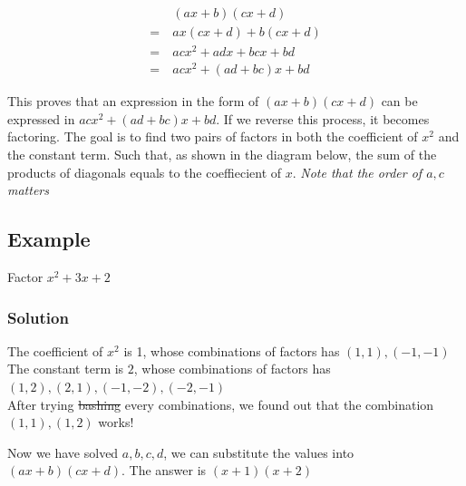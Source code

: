 \documentclass{article}
\begin{document}
\begin{align*}
    &(ax+b)(cx+d)\\
    =\ &ax(cx+d)+b(cx+d)\\
    =\ &acx^2+adx+bcx+bd\\
    =\ &acx^2+(ad+bc)x+bd
\end{align*}
\medskip

This proves that an expression in the form of $(ax+b)(cx+d)$ can be expressed in $acx^2+(ad+bc)x+bd$. If we reverse this process, it becomes factoring. The goal is to find two pairs of factors in both the coefficient of $x^2$ and the constant term. Such that, as shown in the diagram below, the sum of the products of diagonals equals to the coeffiecient of $x$. \emph{Note that the order of $a,c$ matters}\medskip

\begin{center}
\end{center}


\subsection{Example}
\begin{tcolorbox}
Factor $x^2+3x+2$
\end{tcolorbox}
\medskip

\subsubsection{Solution}
The coefficient of $x^2$ is 1, whose combinations of factors has $(1, 1),(-1,-1)$ \\
The constant term is $2$, whose combinations of factors has $(1, 2),(2,1),(-1,-2),(-2,-1)$\\
After trying \sout{bashing} every combinations, we found out that the combination $(1,1),(1,2)$ works!

\begin{center}
\end{center}
Now we have solved $a,b,c,d$, we can substitute the values into $(ax+b)(cx+d)$. The answer is $(x+1)(x+2)$
\end{document}
